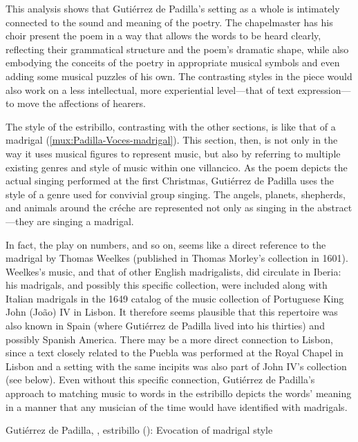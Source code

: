 This analysis shows that Gutiérrez de Padilla's setting as a whole is intimately
connected to the sound and meaning of the poetry.
The chapelmaster has his choir present the poem in a way that allows the words
to be heard clearly, reflecting their grammatical structure and the poem's
dramatic shape, while also embodying the conceits of the poetry in appropriate
musical symbols and even adding some musical puzzles of his own.
The contrasting styles in the piece would also work on a less intellectual, more
experiential level---that of text expression---to move the affections of
hearers.

The style of the estribillo, contrasting with the other sections, is like that
of a madrigal (\cref{mux:Padilla-Voces-madrigal}).
This section, then, is  not only in the way it uses
musical figures to represent music, but also by referring to multiple existing
genres and style of music within one villancico.
As the poem depicts the actual singing performed at the first Christmas,
Gutiérrez de Padilla uses the style of a genre used for convivial group singing.
The angels, planets, shepherds, and animals around the créche are represented
not only as singing in the abstract---they are singing a madrigal.

In fact, the play on numbers,  and so on, seems like a
direct reference to the madrigal  by Thomas Weelkes (published in Thomas Morley's collection
 in 1601).
Weelkes's music, and that of other English madrigalists, did circulate in
Iberia: his madrigals, and possibly this specific collection, were included
along with Italian madrigals in the 1649 catalog of the music collection of
Portuguese King John (João) IV in Lisbon.%
    \Autocite[, 584]{JohnIV:Catalog}
It therefore seems plausible that this repertoire was also known in Spain (where
Gutiérrez de Padilla lived into his thirties) and possibly Spanish America.
There may be a more direct connection to Lisbon, since a text closely related to
the Puebla  was performed at the Royal Chapel in Lisbon and a
setting with the same incipits was also part of John IV's collection (see
below).
Even without this specific connection, Gutiérrez de Padilla's approach to
matching music to words in the estribillo depicts the words' meaning in a manner
that any musician of the time would have identified with madrigals.

{Gutiérrez de Padilla, , estribillo
(): Evocation of madrigal style}

